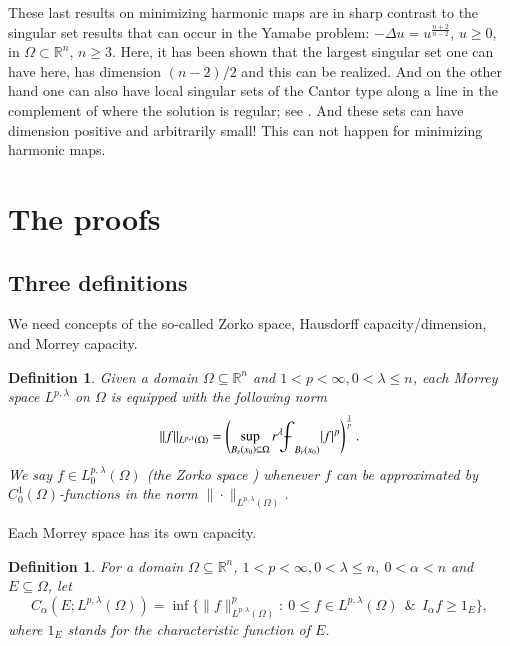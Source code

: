 \documentclass[12pt]{amsart}
\newtheorem{definition}[theorem]{Definition}
\begin{document}
These last results on minimizing harmonic maps are in sharp contrast to the singular set results that can occur in the Yamabe problem: $-\Delta u=u^\frac{n+2}{n-2}$, $u\ge 0$, in $\Omega\subset\mathbb R^n$, $n\ge 3$. Here, it has been shown that the largest singular set one can have here, has dimension $(n-2)/2$ and this can be realized. And on the other hand one can also have local singular sets of the Cantor type along a line in the complement of where the solution is regular; see \cite{SY1988}. And these sets can have dimension positive and arbitrarily small! This can not happen for minimizing harmonic maps.

\section{The proofs}\label{s3}
\setcounter{equation}{0}

\subsection{Three definitions} We need concepts of the so-called Zorko space, Hausdorff capacity/dimension, and Morrey capacity.

\begin{definition}\label{d1} Given a domain $\Omega\subseteq\mathbb R^n$ and $1<p<\infty, 0<\lambda\le n$, each Morrey  space $L^{p,\lambda}$ on $\Omega$ is equipped with the following norm
$$
\|f\|_{L^{p,\lambda}(\Omega)}=\left(\sup_{B_r(x_0)\subseteq\Omega}r^\lambda{{\mathchoice
{{{\setbox0=\hbox{$\displaystyle{\textstyle{-}}{\int}$ }
\vcenter{\hbox{$\textstyle{-}$ }}\kern-.6\wd0}}}{{{\setbox0=\hbox{$\textstyle{\scriptstyle{-}}{\int}$ }
\vcenter{\hbox{$\scriptstyle{-}$ }}\kern-.6\wd0}}}{{{\setbox0=\hbox{$\scriptstyle{\scriptscriptstyle{-}}{\int}$ }
\vcenter{\hbox{$\scriptscriptstyle{-}$ }}\kern-.6\wd0}}}{{{\setbox0=\hbox{$\scriptscriptstyle{\scriptscriptstyle{-}}{\int}$ }
\vcenter{\hbox{$\scriptscriptstyle{-}$ }}\kern-.6\wd0}}}\!\int}}_{B_r(x_0)}|f|^p\right)^\frac1p.
$$
We say $f\in L^{p,\lambda}_0(\Omega)$ (the Zorko space
\cite{Z1986}) whenever $f$ can be approximated by
$C_0^1(\Omega)$-functions in the norm $\|\cdot\|_{L^{p,\lambda}(\Omega)}$.
\end{definition}

Each Morrey space has its own capacity.

\begin{definition}\label{d2} For a domain $\Omega\subseteq\mathbb R^n$, $1<p<\infty, 0<\lambda\le n$, $0<\alpha<n$ and $E\subseteq\Omega$, let
$$
C_\alpha(E;L^{p,\lambda}(\Omega))=\inf\{\|f\|_{L^{p,\lambda}(\Omega)}^p:\
0\le f\in L^{p,\lambda}(\Omega)\ \ \&\ \ I_\alpha f\ge 1_E\},
$$
where $1_E$ stands for the characteristic function of $E$.
\end{definition}
\end{document}
